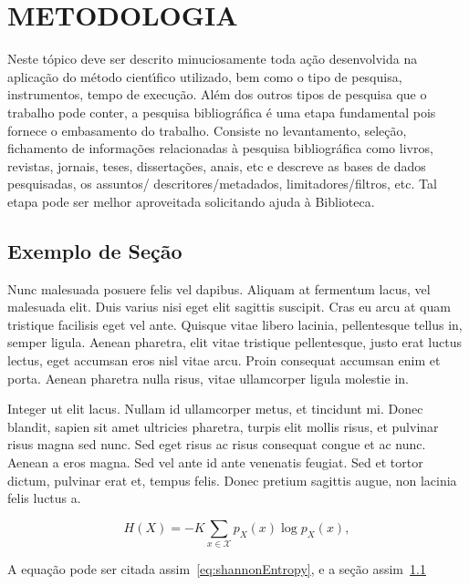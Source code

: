 \chapter{METODOLOGIA}
\label{cap:cap02}

Neste t\'{o}pico deve ser descrito minuciosamente toda a\c{c}\~{a}o desenvolvida na aplica\c{c}\~{a}o do m\'{e}todo cient\'{\i}fico utilizado, bem como o tipo de pesquisa, instrumentos, tempo de execu\c{c}\~{a}o.
Al\'{e}m dos outros tipos de pesquisa que o trabalho pode conter, a pesquisa bibliogr\'{a}fica \'{e} uma etapa fundamental pois fornece o embasamento do trabalho. Consiste no levantamento, sele\c{c}\~{a}o, fichamento de informa\c{c}\~{o}es relacionadas \`{a} pesquisa bibliogr\'{a}fica como livros, revistas, jornais, teses, disserta\c{c}\~{o}es, anais, etc e descreve as bases de dados pesquisadas, os assuntos/ descritores/metadados, limitadores/filtros, etc. Tal etapa pode ser melhor aproveitada solicitando ajuda \`{a} Biblioteca.
\cite{Cover2006,Feynman1998,Haykin2001}

\section{Exemplo de Se\c{c}\~{a}o}
\label{sec:sec02}

Nunc malesuada posuere felis vel dapibus. Aliquam at fermentum lacus, vel malesuada elit. Duis varius nisi eget elit sagittis suscipit. Cras eu arcu at quam tristique facilisis eget vel ante. Quisque vitae libero lacinia, pellentesque tellus in, semper ligula. Aenean pharetra, elit vitae tristique pellentesque, justo erat luctus lectus, eget accumsan eros nisl vitae arcu. Proin consequat accumsan enim et porta. Aenean pharetra nulla risus, vitae ullamcorper ligula molestie in.

Integer ut elit lacus. Nullam id ullamcorper metus, et tincidunt mi. Donec blandit, sapien sit amet ultricies pharetra, turpis elit mollis risus, et pulvinar risus magna sed nunc. Sed eget risus ac risus consequat congue et ac nunc. Aenean a eros magna. Sed vel ante id ante venenatis feugiat. Sed et tortor dictum, pulvinar erat et, tempus felis. Donec pretium sagittis augue, non lacinia felis luctus a.

\begin{equation}
H(X) =-K\sum_{x\in\mathcal{X}} p_X(x)\log p_X(x),
\label{eq:shannonEntropy}
\end{equation}

A equa\c{c}\~{a}o pode ser citada assim~\eqref{eq:shannonEntropy}, e a se\c{c}\~{a}o assim~\ref{sec:sec02}

